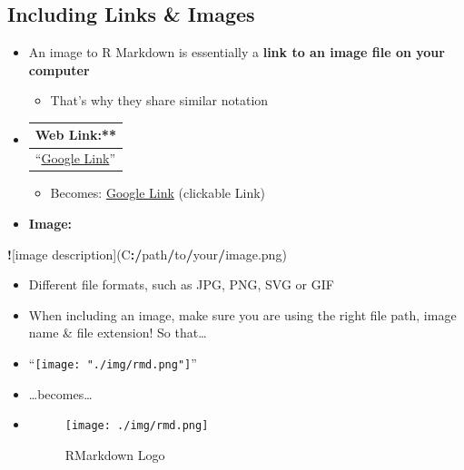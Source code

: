 \documentclass[
]{book}
\newenvironment{Shaded}{\begin{snugshade}}{\end{snugshade}}
\newcommand{\ErrorTok}[1]{\textcolor[rgb]{0.64,0.00,0.00}{\textbf{#1}}}
\newcommand{\NormalTok}[1]{#1}
\newcommand{\SpecialCharTok}[1]{\textcolor[rgb]{0.81,0.36,0.00}{\textbf{#1}}}
\providecommand{\tightlist}{%
  \setlength{\itemsep}{0pt}\setlength{\parskip}{0pt}}
\begin{document}
\subsection{Including Links \& Images}\label{including-links-images}

\begin{itemize}
\item
  An image to R Markdown is essentially a \textbf{link to an image file on your computer}

  \begin{itemize}
  \tightlist
  \item
    That's why they share similar notation
  \end{itemize}
\item
  \begin{longtable}[]{@{}l@{}}
  \toprule\noalign{}
  Web Link:** \\
  \midrule\noalign{}
  \endhead
  \bottomrule\noalign{}
  \endlastfoot
  ``\href{www.google.com}{Google Link}'' \\
  \end{longtable}

  \begin{itemize}
  \tightlist
  \item
    Becomes: \href{https://www.google.com/}{Google Link} (clickable Link)
  \end{itemize}
\item
  \textbf{Image:}
\end{itemize}

\begin{Shaded}
\begin{Highlighting}[]
\SpecialCharTok{!}\NormalTok{[image description](C}\SpecialCharTok{:}\ErrorTok{/}\NormalTok{path}\SpecialCharTok{/}\NormalTok{to}\SpecialCharTok{/}\NormalTok{your}\SpecialCharTok{/}\NormalTok{image.png)}
\end{Highlighting}
\end{Shaded}

\begin{itemize}
\item
  Different file formats, such as JPG, PNG, SVG or GIF
\item
  When including an image, make sure you are using the right file path, image name \& file extension! So that\ldots{}
\item
  ``\texttt{[image: "./img/rmd.png"]}''
\item
  \ldots becomes\ldots{}
\item
  \begin{figure}
  \centering
  \texttt{[image: ./img/rmd.png]}
  \caption{RMarkdown Logo}
  \end{figure}
\end{itemize}
\end{document}
